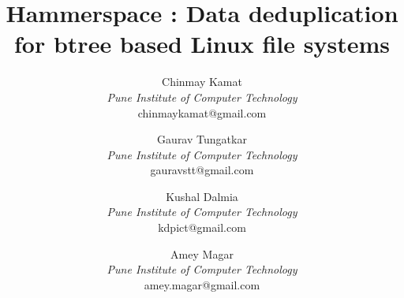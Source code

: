 \documentclass[final]{ols}
\begin{document}

\title{Hammerspace : Data deduplication for btree based Linux file systems}
\date{}             %


\author{%
Chinmay Kamat \\
{\itshape Pune Institute of Computer Technology}\\
{\ttfamily\normalsize chinmaykamat@gmail.com}\\
\and 
Gaurav Tungatkar \\
{\itshape Pune Institute of Computer Technology}\\
{\ttfamily\normalsize gauravstt@gmail.com}\\
\and
Kushal Dalmia\\
{\itshape Pune Institute of Computer Technology}\\
{\ttfamily\normalsize kdpict@gmail.com}\\
\and 
Amey Magar \\
{\itshape Pune Institute of Computer Technology}\\
{\ttfamily\normalsize amey.magar@gmail.com}\\
} %

\maketitle
\end{document}
